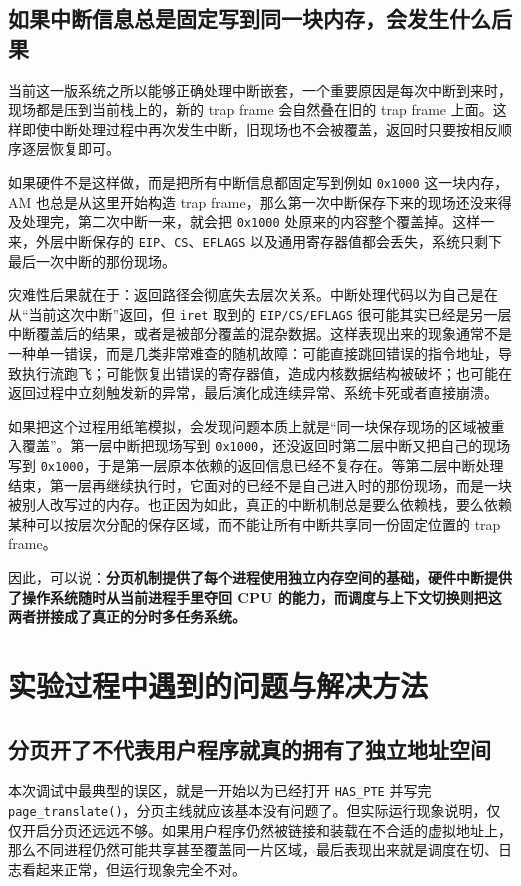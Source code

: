 \documentclass[a4paper]{article}
\begin{document}
\subsection{如果中断信息总是固定写到同一块内存，会发生什么后果}
当前这一版系统之所以能够正确处理中断嵌套，一个重要原因是每次中断到来时，现场都是压到当前栈上的，新的 trap frame 会自然叠在旧的 trap frame 上面。这样即使中断处理过程中再次发生中断，旧现场也不会被覆盖，返回时只要按相反顺序逐层恢复即可。

如果硬件不是这样做，而是把所有中断信息都固定写到例如 \texttt{0x1000} 这一块内存，AM 也总是从这里开始构造 trap frame，那么第一次中断保存下来的现场还没来得及处理完，第二次中断一来，就会把 \texttt{0x1000} 处原来的内容整个覆盖掉。这样一来，外层中断保存的 \texttt{EIP}、\texttt{CS}、\texttt{EFLAGS} 以及通用寄存器值都会丢失，系统只剩下最后一次中断的那份现场。

灾难性后果就在于：返回路径会彻底失去层次关系。中断处理代码以为自己是在从“当前这次中断”返回，但 \texttt{iret} 取到的 \texttt{EIP/CS/EFLAGS} 很可能其实已经是另一层中断覆盖后的结果，或者是被部分覆盖的混杂数据。这样表现出来的现象通常不是一种单一错误，而是几类非常难查的随机故障：可能直接跳回错误的指令地址，导致执行流跑飞；可能恢复出错误的寄存器值，造成内核数据结构被破坏；也可能在返回过程中立刻触发新的异常，最后演化成连续异常、系统卡死或者直接崩溃。

如果把这个过程用纸笔模拟，会发现问题本质上就是“同一块保存现场的区域被重入覆盖”。第一层中断把现场写到 \texttt{0x1000}，还没返回时第二层中断又把自己的现场写到 \texttt{0x1000}，于是第一层原本依赖的返回信息已经不复存在。等第二层中断处理结束，第一层再继续执行时，它面对的已经不是自己进入时的那份现场，而是一块被别人改写过的内存。也正因为如此，真正的中断机制总是要么依赖栈，要么依赖某种可以按层次分配的保存区域，而不能让所有中断共享同一份固定位置的 trap frame。

因此，可以说：\textbf{分页机制提供了每个进程使用独立内存空间的基础，硬件中断提供了操作系统随时从当前进程手里夺回 CPU 的能力，而调度与上下文切换则把这两者拼接成了真正的分时多任务系统。}

\section{实验过程中遇到的问题与解决方法}

\subsection{分页开了不代表用户程序就真的拥有了独立地址空间}
本次调试中最典型的误区，就是一开始以为已经打开 \texttt{HAS\_PTE} 并写完 \texttt{page\_translate()}，分页主线就应该基本没有问题了。但实际运行现象说明，仅仅开启分页还远远不够。如果用户程序仍然被链接和装载在不合适的虚拟地址上，那么不同进程仍然可能共享甚至覆盖同一片区域，最后表现出来就是调度在切、日志看起来正常，但运行现象完全不对。
\end{document}
